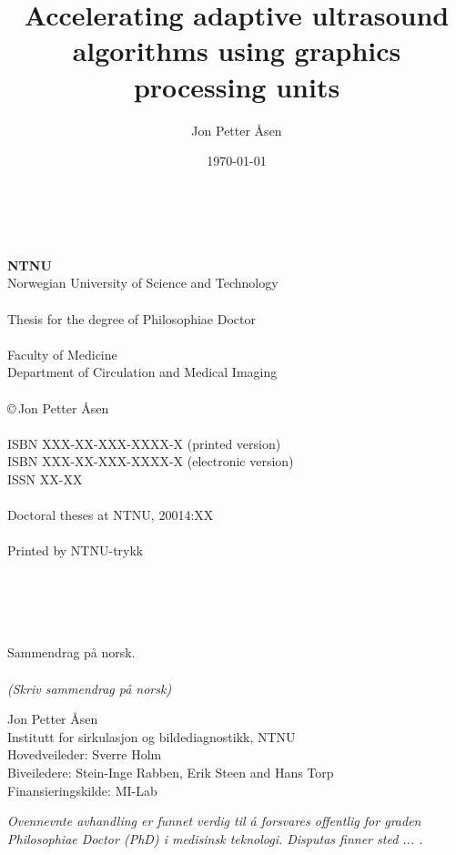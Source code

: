 \documentclass[10pt,b5paper,twoside]{book}
\author{Jon Petter \AA{}sen}
\title{%
Accelerating adaptive ultrasound algorithms using graphics processing units 
\vspace{0.5cm}}
\newcommand\todo[1]{{\textit{\color{red}(#1)}}}
\begin{document}
\date{\today}
\pagestyle{empty} \maketitle

\newpage%
~\\
\vspace{10.0cm}
~\\
{\bf NTNU}
\\
Norwegian University of Science and Technology\\
\\
Thesis for the degree of Philosophiae Doctor\\
\\
Faculty of Medicine\\
Department of Circulation and Medical Imaging\\
\\
\copyright\,Jon Petter \AA{}sen\\
\\
ISBN XXX-XX-XXX-XXXX-X (printed version)\\
ISBN XXX-XX-XXX-XXXX-X (electronic version)\\
ISSN XX-XX\\
\\
Doctoral theses at NTNU, 20014:XX\\
\\
Printed by NTNU-trykk

~\\
\newpage
\thispagestyle{empty}%
~\\%
~\\%
~\\
\noindent\large 
Sammendrag p\aa{} norsk.
\\\\%
\normalsize
\todo{Skriv sammendrag p\aa{} norsk}

\vspace{0.3cm}
\noindent Jon Petter \AA{}sen\\
Institutt for sirkulasjon og bildediagnostikk, NTNU\\
Hovedveileder: Sverre Holm\\ 
Biveiledere: Stein-Inge Rabben, Erik Steen and Hans Torp\\
Finansieringskilde: MI-Lab

\vspace{0.2cm}
\noindent \emph{Ovennevnte avhandling er funnet verdig til \aa{} forsvares offentlig for graden Philosophiae Doctor (PhD) i medisinsk teknologi. Disputas finner sted ... .}
\end{document}
